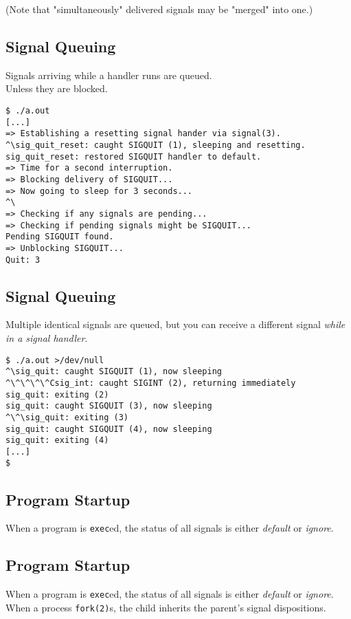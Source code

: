 \documentclass[xga]{xdvislides}
\begin{document}
(Note that "simultaneously" delivered signals may be "merged" into one.)

\subsection{Signal Queuing}
Signals arriving while a handler runs are queued. \\
Unless they are blocked.

\begin{verbatim}
$ ./a.out
[...]
=> Establishing a resetting signal hander via signal(3).
^\sig_quit_reset: caught SIGQUIT (1), sleeping and resetting.
sig_quit_reset: restored SIGQUIT handler to default.
=> Time for a second interruption.
=> Blocking delivery of SIGQUIT...
=> Now going to sleep for 3 seconds...
^\
=> Checking if any signals are pending...
=> Checking if pending signals might be SIGQUIT...
Pending SIGQUIT found.
=> Unblocking SIGQUIT...
Quit: 3
\end{verbatim}


\subsection{Signal Queuing}
Multiple identical signals are queued, but you can receive a different
signal {\em while in a signal handler}.
\begin{verbatim}
$ ./a.out >/dev/null
^\sig_quit: caught SIGQUIT (1), now sleeping
^\^\^\^\^Csig_int: caught SIGINT (2), returning immediately
sig_quit: exiting (2)
sig_quit: caught SIGQUIT (3), now sleeping
^\^\sig_quit: exiting (3)
sig_quit: caught SIGQUIT (4), now sleeping
sig_quit: exiting (4)
[...]
$
\end{verbatim}

\subsection{Program Startup}

When a program is {\tt exec}ed, the status of all signals is either {\em
default} or {\em ignore}.

\subsection{Program Startup}

When a program is {\tt exec}ed, the status of all signals is either {\em
default} or {\em ignore}.
\\

When a process {\tt fork(2)}s, the child inherits the parent's signal
dispositions.
\end{document}
